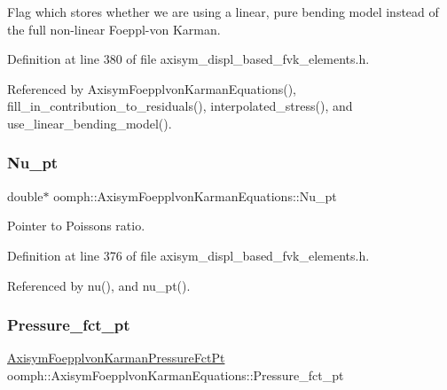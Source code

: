 Flag which stores whether we are using a linear, pure bending model instead of the full non-\/linear Foeppl-\/von Karman. 



Definition at line 380 of file axisym\+\_\+displ\+\_\+based\+\_\+fvk\+\_\+elements.\+h.



Referenced by Axisym\+Foepplvon\+Karman\+Equations(), fill\+\_\+in\+\_\+contribution\+\_\+to\+\_\+residuals(), interpolated\+\_\+stress(), and use\+\_\+linear\+\_\+bending\+\_\+model().

\mbox{\label{classoomph_1_1AxisymFoepplvonKarmanEquations_a02dd0294aa3239752ea7c21018ac65b6}} 
\subsubsection{\texorpdfstring{Nu\+\_\+pt}{Nu\_pt}}
{\footnotesize\ttfamily double$\ast$ oomph\+::\+Axisym\+Foepplvon\+Karman\+Equations\+::\+Nu\+\_\+pt\hspace{0.3cm}{\ttfamily [protected]}}



Pointer to Poisson\textquotesingle{}s ratio. 



Definition at line 376 of file axisym\+\_\+displ\+\_\+based\+\_\+fvk\+\_\+elements.\+h.



Referenced by nu(), and nu\+\_\+pt().

\mbox{\label{classoomph_1_1AxisymFoepplvonKarmanEquations_a06ebccc2c0b2638657c98f6137de7d4b}} 
\subsubsection{\texorpdfstring{Pressure\+\_\+fct\+\_\+pt}{Pressure\_fct\_pt}}
{\footnotesize\ttfamily \hyperlink{classoomph_1_1AxisymFoepplvonKarmanEquations_a504878b18d793ef8a6540eb0f2b086c8}{Axisym\+Foepplvon\+Karman\+Pressure\+Fct\+Pt} oomph\+::\+Axisym\+Foepplvon\+Karman\+Equations\+::\+Pressure\+\_\+fct\+\_\+pt\hspace{0.3cm}{\ttfamily [protected]}}



